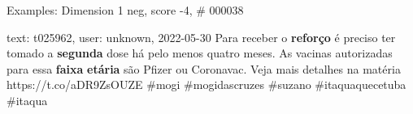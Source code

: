 \begin{frame}{Examples: Dimension 1 neg, score -4, \# 000038}
\footnotesize
\begin{alertblock}{text: t025962, user: unknown, 2022-05-30}
Para receber o \textbf{reforço} é preciso ter tomado a \textbf{segunda} dose há 
pelo menos quatro meses. As vacinas autorizadas para essa \textbf{faixa} 
\textbf{etária} são Pfizer ou Coronavac. Veja mais detalhes na matéria 
https://t.co/aDR9ZsOUZE \#mogi \#mogidascruzes \#suzano \#itaquaquecetuba 
\#itaqua 
\end{alertblock}
\end{frame}
